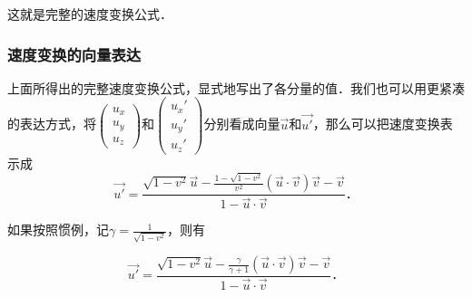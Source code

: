 这就是完整的速度变换公式．

\subsubsection{速度变换的向量表达}

上面所得出的完整速度变换公式，显式地写出了各分量的值．我们也可以用更紧凑的表达方式，将$\left(\begin{matrix}u_x\\u_y\\u_z\end{matrix} \right) $和$\left(\begin{matrix}u_x'\\u_y'\\u_z'\end{matrix} \right)$分别看成向量$\vec{u}$和$\vec{u'}$，那么可以把速度变换表示成
\begin{equation}

\vec{u'}=\frac{\sqrt{1-v^2}\vec{u}-\frac{1-\sqrt{1-v^2}}{v^2}(\vec{u}\cdot\vec{v})\vec{v}-\vec{v}}{1-\vec{u}\cdot\vec{v}}．

\end{equation}

如果按照惯例，记$\gamma=\frac{1}{\sqrt{1-v^2}}$，则有

\begin{equation}

\vec{u'}=\frac{\sqrt{1-v^2}\vec{u}-\frac{\gamma}{\gamma+1}(\vec{u}\cdot\vec{v})\vec{v}-\vec{v}}{1-\vec{u}\cdot\vec{v}}．

\end{equation}




